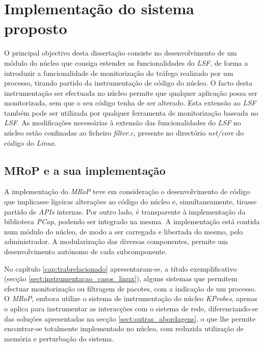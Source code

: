 \chapter{Implementação do sistema proposto}
\label{cap:Implementacao}




O principal objectivo desta dissertação consiste no desenvolvimento de um módulo do núcleo que consiga estender as funcionalidades do \textit{LSF}, de forma a introduzir a funcionalidade de monitorização do tráfego realizado por um processo, tirando partido da instrumentação de código do núcleo.
O facto desta instrumentação ser efectuada no núcleo permite que qualquer aplicação possa ser monitorizada, sem que o seu código tenha de ser alterado.
Esta extensão ao \textit{LSF} também pode ser utilizada por qualquer ferramenta de monitorização baseada no \textit{LSF}.
As modificações necessárias à extensão das funcionalidades do \textit{LSF} no núcleo estão confinadas ao ficheiro \textit{filter.c}, presente no directório \textit{net/core} do código do \textit{Linux}.

\section{MRoP e a sua implementação}
\label{sec:mrop_implementation}

A implementação do \textit{MRoP} teve em consideração o desenvolvimento de código que implicasse ligeiras alterações ao código do núcleo e, simultaneamente, tirasse partido de \textit{APIs} internas.
Por outro lado, é transparente à implementação da biblioteca \textit{PCap}, podendo ser integrado na mesma.
A implementação está contida num módulo do núcleo, de modo a ser carregada e libertada do mesmo, pelo administrador.
A modularização das diversas componentes, permite um desenvolvimento autónomo de cada subcomponente.

No capítulo \ref{cap:trabrelacionado} apresentaram-se, a título exemplificativo (secção \ref{sect:instrumentacao_casos_linux}), alguns sistemas que permitem efectuar monitorização ou filtragem de pacotes, com a indicação de um processo.
O \textit{MRoP}, embora utilize o sistema de instrumentação do núcleo \textit{KProbes}, apenas o aplica para instrumentar as interacções com o sistema de rede, diferenciando-se das soluções apresentadas na secção \ref{sect:outras_abordagens}, o que lhe permite encontrar-se totalmente implementado no núcleo, com reduzida utilização de memória e perturbação do sistema.

